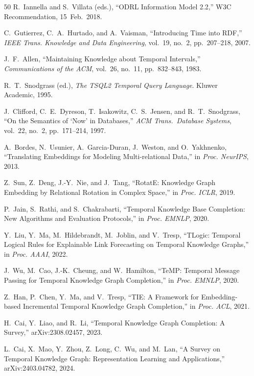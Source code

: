 \documentclass{ieeeaccess}
\begin{document}
\begin{thebibliography}{50}
R.~Iannella and S.~Villata (eds.), ``ODRL Information Model 2.2,'' W3C Recommendation, 15~Feb.~2018.

C.~Gutierrez, C.~A.~Hurtado, and A.~Vaisman, ``Introducing Time into RDF,'' \textit{IEEE Trans. Knowledge and Data Engineering}, vol.~19, no.~2, pp.~207--218, 2007.

J.~F.~Allen, ``Maintaining Knowledge about Temporal Intervals,'' \textit{Communications of the ACM}, vol.~26, no.~11, pp.~832--843, 1983.

R.~T.~Snodgrass (ed.), \textit{The TSQL2 Temporal Query Language}. Kluwer Academic, 1995.

J.~Clifford, C.~E.~Dyreson, T.~Isakowitz, C.~S.~Jensen, and R.~T.~Snodgrass, ``On the Semantics of `Now' in Databases,'' \textit{ACM Trans.\ Database Systems}, vol.~22, no.~2, pp.~171--214, 1997.

A.~Bordes, N.~Usunier, A.~Garcia-Duran, J.~Weston, and O.~Yakhnenko, ``Translating Embeddings for Modeling Multi-relational Data,'' in \textit{Proc. NeurIPS}, 2013.

Z.~Sun, Z.~Deng, J.-Y.~Nie, and J.~Tang, ``RotatE: Knowledge Graph Embedding by Relational Rotation in Complex Space,'' in \textit{Proc. ICLR}, 2019.

P.~Jain, S.~Rathi, and S.~Chakrabarti, ``Temporal Knowledge Base Completion: New Algorithms and Evaluation Protocols,'' in \textit{Proc. EMNLP}, 2020.

Y.~Liu, Y.~Ma, M.~Hildebrandt, M.~Joblin, and V.~Tresp, ``TLogic: Temporal Logical Rules for Explainable Link Forecasting on Temporal Knowledge Graphs,'' in \textit{Proc. AAAI}, 2022.

J.~Wu, M.~Cao, J.-K.~Cheung, and W.~Hamilton, ``TeMP: Temporal Message Passing for Temporal Knowledge Graph Completion,'' in \textit{Proc. EMNLP}, 2020.

Z.~Han, P.~Chen, Y.~Ma, and V.~Tresp, ``TIE: A Framework for Embedding-based Incremental Temporal Knowledge Graph Completion,'' in \textit{Proc. ACL}, 2021.

H.~Cai, Y.~Liao, and R.~Li, ``Temporal Knowledge Graph Completion: A Survey,'' arXiv:2308.02457, 2023.

L.~Cai, X.~Mao, Y.~Zhou, Z.~Long, C.~Wu, and M.~Lan, ``A Survey on Temporal Knowledge Graph: Representation Learning and Applications,'' arXiv:2403.04782, 2024.


\end{thebibliography}
\end{document}
